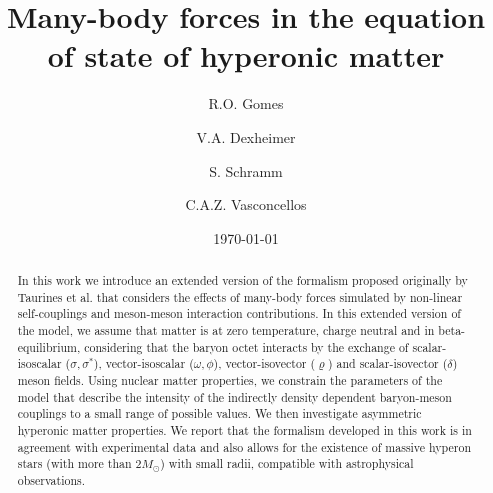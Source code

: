 \documentclass[twocolumn,showpacs,aps]{revtex4}
\begin{document}
\title{Many-body forces in the equation of state of hyperonic matter}

\author{R.O. Gomes}
        
 \author{V.A. Dexheimer}


\author{S. Schramm}

\author{C.A.Z. Vasconcellos}


\date{\today}

\begin{abstract}
In this work we introduce an extended version of the formalism proposed originally by Taurines et al. that considers 
the effects of many-body forces simulated by non-linear self-couplings and meson-meson interaction contributions.
In this extended version of the model, we assume that matter is at zero temperature, charge neutral and in beta-equilibrium,
considering that the baryon octet 
interacts by the exchange of scalar-isoscalar ($\sigma$,$\,\sigma^*$), vector-isoscalar ($\omega$,$\,\phi$), vector-isovector ($\varrho$)
and scalar-isovector ($\delta$) meson fields. %
Using nuclear matter properties, we constrain the parameters of the model
that describe the intensity of the indirectly density dependent baryon-meson couplings to a small range of possible values.
We then investigate asymmetric hyperonic matter properties. %
We report that the formalism developed in this work %
is in agreement with experimental data and also allows for the existence of massive hyperon stars (with more than $2M_{\odot}$) 
with small radii, compatible with astrophysical observations.  


\end{abstract}
\end{document}
